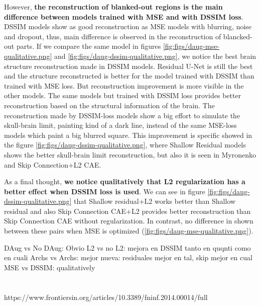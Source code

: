 However, \textbf{the reconstruction of blanked-out regions is the main difference between models trained with MSE and with DSSIM loss}. DSSIM models show as good reconstruction as MSE models with blurring, noise and dropout, thus, main difference is observed in the reconstruction of blancked-out parts. If we compare the same model in figures \ref{fig:figs/daug-mse-qualitative.png} and \ref{fig:figs/daug-dssim-qualitative.png}, we notice the best brain structure reconstruction made in DSSIM models. Residual U-Net is still the best and the structure reconstructed is better for the model trained with DSSIM than trained with MSE loss. But reconstruction improvement is more visible in the other models. The same models but trained with DSSIM loss provides better reconstruction based on the structural information of the brain. The reconstruction made by DSSIM-loss models show a big effort to simulate the skull-brain limit, painting kind of a dark line, instead of the same MSE-loss models which paint a big blurred square. This improvement is specific showed in the figure \ref{fig:figs/daug-dssim-qualitative.png}, where Shallow Residual models shows the better skull-brain limit reconstruction, but also it is seen in Myronenko and Skip Connection+L2 CAE. 

As a final thought, \textbf{we notice qualitatively that L2 regularization has a better effect when DSSIM loss is used}. We can see in figure \ref{fig:figs/daug-dssim-qualitative.png} that Shallow residual+L2 works better than Shallow residual and also Skip Connection CAE+L2 provides better reconstruction than Skip Connection CAE without regularization. In contrast, no difference in shown between these pairs when MSE is optimized (\ref{fig:figs/daug-mse-qualitative.png}).



\iffalse
DAug vs No DAug: Obvio
L2 vs no L2: mejora en DSSIM tanto en quqnti como en cuali
Archs vs Archs: mejor nueva: residuales mejor en tal, skip mejor en cual
MSE vs DSSIM: qualitatively

\section{}
\label{section:data_preprocessing}
 
https://www.frontiersin.org/articles/10.3389/fninf.2014.00014/full

 
